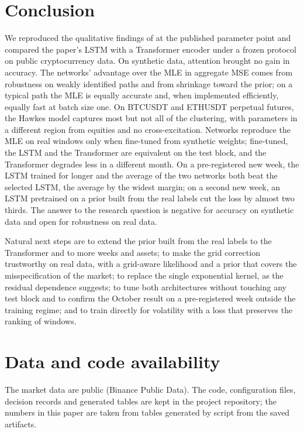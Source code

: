 \documentclass[preprint,12pt,authoryear]{elsarticle}
\begin{document}
\section{Conclusion}
\label{sec:conclusion}

We reproduced the qualitative findings of \citet{lee2023} at the published parameter point
and compared the paper's LSTM with a Transformer encoder under a frozen protocol on public
cryptocurrency data. On synthetic data, attention brought no gain in accuracy. The networks'
advantage over the MLE in aggregate MSE comes from robustness on weakly identified paths and
from shrinkage toward the prior; on a typical path the MLE is equally accurate and, when
implemented efficiently, equally fast at batch size one. On BTCUSDT and ETHUSDT perpetual
futures, the Hawkes model captures most but not all of the clustering, with parameters in a
different region from equities and no cross-excitation. Networks reproduce the MLE on real
windows only when fine-tuned from synthetic weights; fine-tuned, the LSTM and the Transformer
are equivalent on the test block, and the Transformer degrades less in a different month. On
a pre-registered new week, the LSTM trained for longer and the average of the two networks
both beat the selected LSTM, the average by the widest margin; on a second new week, an LSTM
pretrained on a prior built from the real labels cut the loss by almost two thirds. The
answer to the research question is negative for accuracy on synthetic data and open for
robustness on real data.

Natural next steps are to extend the prior built from the real labels to the Transformer and
to more weeks and assets; to make the grid correction trustworthy on real data, with a
grid-aware likelihood \citep{lambe2025} and a prior that covers the misspecification of the
market; to replace the single exponential kernel, as the residual dependence
suggests; to tune both architectures without touching any test block and to confirm the
October result on a pre-registered week outside the training regime; and to train directly for volatility with a
loss that preserves the ranking of windows.

\section*{Data and code availability}

The market data are public (Binance Public Data). The code, configuration files, decision
records and generated tables are kept in the project repository; the numbers in this paper are
taken from tables generated by script from the saved artifacts. %
\end{document}
